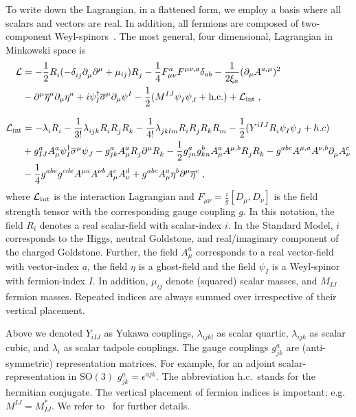 \documentclass[11pt]{article}
\renewcommand{\nn}{\nonumber \\}
\renewcommand{\rmi}[1]{{\mbox{\scriptsize #1}}}
\begin{document}
To write down the Lagrangian, in a flattened form, we employ a basis where
all scalars and vectors are real.
In addition, all fermions are composed of
two-component Weyl-spinors~\cite{Dreiner:2008tw}.
%
The most general, four dimensional, Lagrangian in
Minkowski space is~\cite{Martin:2017lqn,Martin:2018emo,Braaten:1995cm}
\begin{align}
\mathcal{L}&=
  - \frac{1}{2} R_{i}^{ }(-\delta_{ij}^{ }\partial_\mu^{ } \partial^\mu + \mu_{ij}) R_{j}^{ }
  - \frac{1}{4}F_{\mu \nu}^a F^{\mu \nu,a}\delta_{ab}
  - \frac{1}{2 \xi_a}(\partial_\mu A^{a,\mu})^2
  \nn &
  - \partial^\mu \overline{\eta}^a \partial_\mu \eta^a
  + i\psi_{I}^{\dagger}\overline{\sigma}^\mu \partial_\mu \psi^{I}
  - \frac{1}{2}(M^{IJ}\psi_{I}^{ } \psi_{J}^{ } + \text{h.c.})
  + \mathcal{L}_{\rmi{int}}
  \;,
  \\[3mm]
\mathcal{L}_{\rmi{int}}&=
 -\lambda_i^{} R_i^{} - \frac{1}{3!}\lambda_{i j k}^{ }R_{i}^{ } R_{j}^{ } R_{k}^{ }
  - \frac{1}{4!}\lambda_{jkl m}^{ }R_{i}^{ } R_{j}^{ } R_{k}^{ } R_{m}^{ }
  - \frac{1}{2}(Y^{i I J }R_{i}^{ } \psi_{I}^{ } \psi_{J}^{ } + h.c)
  \nn &
  + g_{IJ}^{a}A^a_\mu \psi_{I}^{\dagger}\overline{\sigma}^\mu \psi_{J}^{ }
  - g_{jk}^{a}A^a_\mu  R_{j}^{ } \partial^\mu R_{k}^{ } 
  - \frac{1}{2}g^{a}_{j n}g^b_{kn}A_\mu^a A^{\mu,b}R_{j}^{ } R_{k}^{ }
  - g^{abc}A^{\mu,a}A^{\nu,b}\partial_\mu^{ } A^c_\nu
  \nn &
  - \frac{1}{4}g^{abe}g^{cde}A^{\mu a}A^{\nu b}A_{\mu}^c A_\nu^d
  + g^{abc}A_\mu^a \eta^b \partial^\mu \overline{\eta}^c
  \;,
\end{align}
where
$\mathcal{L}_{\rmi{int}}$ is the interaction Lagrangian and
$F_{\mu \nu} = \frac{i}{g}[D_\mu,D_\nu]$ is the field strength tensor
with the corresponding gauge coupling $g$.
In this notation,
the field $R_i$ denotes a real scalar-field with scalar-index $i$.
In the Standard Model, $i$ corresponds to
the Higgs,
neutral Goldstone, and
real/imaginary component of the charged Goldstone.
Further,
the field $A_\mu^a$ corresponds to a real vector-field with vector-index $a$,
the field $\eta$ is a ghost-field and
the field $\psi_I$ is a Weyl-spinor with fermion-index $I$.
In addition,
$\mu_{ij}$ denote (squared) scalar masses, and
$M_{IJ}$ fermion masses.
Repeated indices are always summed over irrespective of their vertical placement.

Above we denoted
$Y_{i I J}$ as Yukawa couplings,
$\lambda_{i j k l}$ as scalar quartic,
$\lambda_{i j k}$ as scalar cubic, and 
$\lambda_{i }$ as scalar tadpole couplings.
The gauge couplings
$g^{a}_{j k}$ are (anti-symmetric) representation matrices.
For example,
for an adjoint scalar-representation in $\mathrm{SO}(3)$
$g^{a}_{j k}=\epsilon^{a j k}$. 
The abbreviation h.c.\ stands for the hermitian conjugate.
The vertical placement of fermion indices is important;
e.g.\ $M^{IJ}=M^{*}_{IJ}$.
We refer to~\cite{Dreiner:2008tw} for further details.
\end{document}
